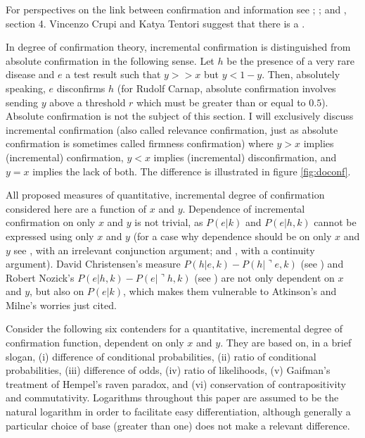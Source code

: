 \documentclass[11pt]{article}
\begin{document}
For perspectives on the link between confirmation and information see
; ; and
, section 4. Vincenzo Crupi and Katya Tentori
suggest that there is a  . 

In degree of confirmation theory, incremental confirmation is
distinguished from absolute confirmation in the following sense. Let
$h$ be the presence of a very rare disease and $e$ a test result such
that $y>>x$ but $y<1-y$. Then, absolutely speaking, $e$ disconfirms
$h$ (for Rudolf Carnap, absolute confirmation involves sending $y$
above a threshold $r$ which must be greater than or equal to $0.5$).
Absolute confirmation is not the subject of this section. I will
exclusively discuss incremental confirmation (also called relevance
confirmation, just as absolute confirmation is sometimes called
firmness confirmation) where $y>x$ implies (incremental) confirmation,
$y<x$ implies (incremental) disconfirmation, and $y=x$ implies the
lack of both. The difference is illustrated in figure
\ref{fig:doconf}.

All proposed measures of quantitative, incremental degree of
confirmation considered here are a function of $x$ and $y$. Dependence
of incremental confirmation on only $x$ and $y$ is not trivial, as
$P(e|k)$ and $P(e|h,k)$ cannot be expressed using only $x$ and $y$
(for a case why dependence should be on only $x$ and $y$ see
, with an irrelevant conjunction argument;
and , with a continuity argument). David
Christensen's measure $P(h|e,k)-P(h|\urcorner{}e,k)$ (see
) and Robert Nozick's
$P(e|h,k)-P(e|\urcorner{}h,k)$ (see ) are not
only dependent on $x$ and $y$, but also on $P(e|k)$, which makes them
vulnerable to Atkinson's and Milne's worries just cited.

Consider the following six contenders for a quantitative, incremental
degree of confirmation function, dependent on only $x$ and $y$. They
are based on, in a brief slogan, (i) difference of conditional
probabilities, (ii) ratio of conditional probabilities, (iii)
difference of odds, (iv) ratio of likelihoods, (v) Gaifman's treatment
of Hempel's raven paradox, and (vi) conservation of contrapositivity
and commutativity. Logarithms throughout this paper are assumed to be
the natural logarithm in order to facilitate easy differentiation,
although generally a particular choice of base (greater than one) does
not make a relevant difference.
\end{document}
